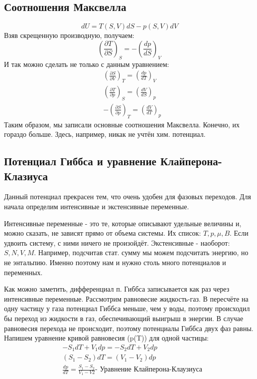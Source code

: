 \documentclass[a4paper, 12pt]{article}
\begin{document}
	\subsection{Соотношения Максвелла}
	\begin{equation*}
		dU = T(S,V)dS - p(S,V)dV
	\end{equation*}
	Взяв скрещенную производную, получаем:
	\begin{equation*}
		(\frac{\partial T}{\partial S})_{S} = -(\frac{dp}{dS})_{V}
	\end{equation*}
	И так можно сделать не только с данным уравнением:
	\begin{equation*}
		\begin{aligned}
			& (\frac{\partial S}{\partial V})_{T} = (\frac{dp}{dT})_{V}  \\
			& (\frac{\partial T}{\partial p})_{S} = (\frac{dV}{dS})_{p}  \\
			& -(\frac{\partial S}{\partial p})_{T} = (\frac{dV}{dT})_{p} 
		\end{aligned}
	\end{equation*}
	Таким образом, мы записали основные соотношения Максвелла. Конечно, их гораздо больше. Здесь, например, никак не учтён хим. потенциал. 
	\subsection{Потенциал Гиббса и уравнение Клайперона-Клазиуса}
	Данный потенциал прекрасен тем, что очень удобен для фазовых переходов. Для начала определим интенсивные и экстенсивные переменные.
	
	Интенсивные переменные - это те, которые описывают удельные величины и, можно сказать, не зависят прямо от объема системы. Их список: $T, p, \mu, B$. Если удвоить систему, с ними ничего не произойдёт. Экстенсивные - наоборот: $S,N,V,M$. Например, подсчитав стат. сумму мы можем подсчитать энергию, но не энтальпию. Именно поэтому нам и нужно столь много потенциалов и переменных.
	
	Как можно заметить, дифференциал п. Гиббса записывается как раз через интенсивные переменные. Рассмотрим равновесие жидкость-газ. В пересчёте на одну частицу у газа потенциал Гиббса меньше, чем у воды, поэтому происходил бы переход из жидкости в газ, обеспечивающий выигрыш в энергии. В случае равновесия перехода не происходит, поэтому потенциалы Гиббса двух фаз равны. Напишем уравнение кривой равновесия (p(T)) для одной частицы:
	\begin{equation*}
		\begin{aligned}
			& -S_{1} dT + V_{1}dp = -S_{2} dT + V_{2} dp                                                                         \\
			& (S_{1}-S_{2})dT=(V_{1}-V_{2})dp                                                                                    \\
			& \frac{dp}{dT} = \frac{S_{1}-S_{2}}{V_{1}-V{2}} \text{- Уравнение Клайперона-Клаузиуса} 
		\end{aligned}
	\end{equation*}
\end{document}
